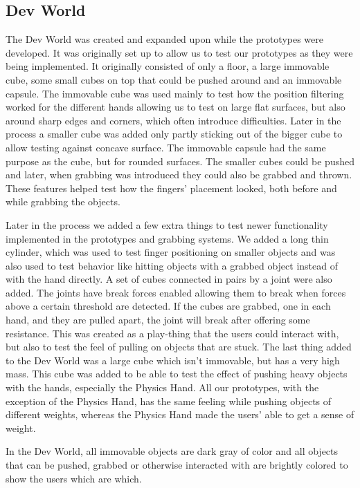 \subsection{Dev World}
\label{subsec:devWorld}
The Dev World was created and expanded upon while the prototypes were developed. It was originally set up to allow us to test our prototypes as they were being implemented. It originally consisted of only a floor, a large immovable cube, some small cubes on top that could be pushed around and an immovable capsule. The immovable cube was used mainly to test how the position filtering worked for the different hands allowing us to test on large flat surfaces, but also around sharp edges and corners, which often introduce difficulties. Later in the process a smaller cube was added only partly sticking out of the bigger cube to allow testing against concave surface. The immovable capsule had the same purpose as the cube, but for rounded surfaces. The smaller cubes could be pushed and later, when grabbing was introduced they could also be grabbed and thrown. These features helped test how the fingers' placement looked, both before and while grabbing the objects.

Later in the process we added a few extra things to test newer functionality implemented in the prototypes and grabbing systems. We added a long thin cylinder, which was used to test finger positioning on smaller objects and was also used to test behavior like hitting objects with a grabbed object instead of with the hand directly. A set of cubes connected in pairs by a joint were also added. The joints have break forces enabled allowing them to break when forces above a certain threshold are detected. If the cubes are grabbed, one in each hand, and they are pulled apart, the joint will break after offering some resistance. This was created as a play-thing that the users could interact with, but also to test the feel of pulling on objects that are stuck. The last thing added to the Dev World was a large cube which isn't immovable, but has a very high mass. This cube was added to be able to test the effect of pushing heavy objects with the hands, especially the Physics Hand. All our prototypes, with the exception of the Physics Hand, has the same feeling while pushing objects of different weights, whereas the Physics Hand made the users' able to get a sense of weight.

In the Dev World, all immovable objects are dark gray of color and all objects that can be pushed, grabbed or otherwise interacted with are brightly colored to show the users which are which.


